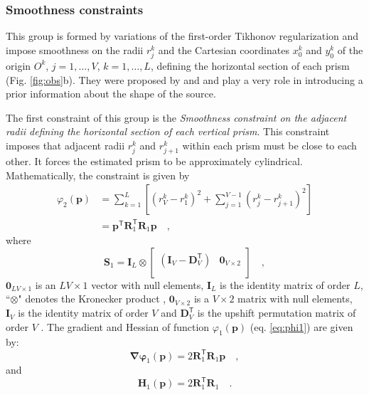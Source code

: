 \subsubsection{Smoothness constraints}

This group is formed by variations of the first-order Tikhonov regularization \citep[][ p. 103]{aster-etal2019}
and impose smoothness on the radii $r_{j}^{k}$ and the Cartesian coordinates $x_{0}^{k}$ and $y_{0}^{k}$ of the origin 
$O^{k}$, $j = 1, \dots, V$, $k = 1, \dots, L$, defining the horizontal section of each prism (Fig. \ref{fig:obs}b).
They were proposed by \cite{oliveirajr-etal2011} and \cite{oliveirajr-barbosa2013} and play a very 
role in introducing a prior information about the shape of the source. 

The first constraint of this group is the \textit{Smoothness constraint on the adjacent radii defining the horizontal 
section of each vertical prism}. This constraint imposes that adjacent radii $r_{j}^{k}$ and $r_{j+1}^{k}$ within each 
prism must be close to each other. It forces the estimated prism to be approximately cylindrical. Mathematically, the constraint is given by
\begin{equation}\label{eq:ph1}
\begin{split}
\varphi_{2}(\mathbf{p}) &= \sum\limits^{L}_{k=1}\left[\left(r^{k}_{V}-r^{k}_{1}\right)^2 + \sum\limits^{V-1}_{j=1}\left(r^{k}_{j}-r^{k}_{j+1}\right)^2\right]\\
 &= \mathbf{p}^{\mathsf{T}} \mathbf{R}^{\mathsf{T}}_{1}\mathbf{R}_{1} \mathbf{p} \quad ,
\end{split}
\end{equation}
where
\begin{equation}
\mathbf{S}_{1} = 
\mathbf{I}_{L} \otimes 
\begin{bmatrix}
\left( \mathbf{I}_{V} - \mathbf{D}_{V}^\mathsf{T} \right) & \mathbf{0}_{V \times 2} \\
\end{bmatrix} \quad ,
\label{eq:S1-matrix}
\end{equation}
$\mathbf{0}_{LV \times 1}$ is an $LV \times 1$ vector with null elements, 
$\mathbf{I}_{L}$ is the identity matrix of order $L$, ``$\otimes$" denotes the Kronecker product 
\citep[][ p. 243]{horn_johnson1991}, $\mathbf{0}_{V \times 2}$ is a $V \times 2$ matrix with null elements, 
$\mathbf{I}_{V}$ is the identity matrix of order $V$ and $\mathbf{D}_{V}^\mathsf{T}$ is the upshift permutation 
matrix of order $V$ \citep[][ p. 20]{golub-vanloan2013}. The gradient and Hessian of function $\varphi_{1}(\mathbf{p})$ (eq. \ref{eq:phi1}) are given by:
\begin{equation}\label{eq:phi1_grad}
\boldsymbol{\nabla\varphi}_{1}(\mathbf{p}) = 2 \mathbf{R}^\mathsf{T}_{1}\mathbf{R}_{1}\mathbf{p} \quad ,
\end{equation}
and
\begin{equation}\label{eq:phi1_hessian}
\mathbf{H}_{1}(\mathbf{p}) = 2\mathbf{R}^\mathsf{T}_{1}\mathbf{R}_{1} \quad .
\end{equation}

